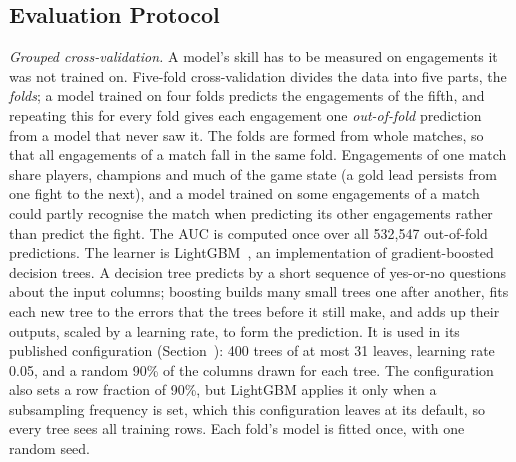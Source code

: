 \subsection{Evaluation Protocol}\label{sec:pred-protocol}

\emph{Grouped cross-validation.} A model's skill has to be measured on engagements it was not trained on.
Five-fold cross-validation divides the data into five parts, the \emph{folds}; a model trained on four
folds predicts the engagements of the fifth, and repeating this for every fold gives each engagement one
\emph{out-of-fold} prediction from a model that never saw it. The folds are formed from whole matches, so
that all engagements of a match fall in the same fold. Engagements of one match share players, champions
and much of the game state (a gold lead persists from one fight to the next), and a model trained on some
engagements of a match could partly recognise the match when predicting its other engagements rather than
predict the fight. The AUC is computed once over all 532,547 out-of-fold predictions.
The learner is LightGBM~\cite{ke2017lightgbm}, an implementation of gradient-boosted decision trees. A
decision tree predicts by a short sequence of yes-or-no questions about the input columns; boosting builds
many small trees one after another, fits each new tree to the errors that the trees before it still make,
and adds up their outputs, scaled by a learning rate, to form the prediction. It is used in its published
configuration (Section~): 400 trees of at most 31 leaves, learning rate 0.05,
and a random 90\% of the columns drawn for each tree. The configuration also sets a row fraction of 90\%, but LightGBM
applies it only when a subsampling frequency is set, which this configuration leaves at its default, so
every tree sees all training rows. Each fold's model is fitted once, with one random seed.

